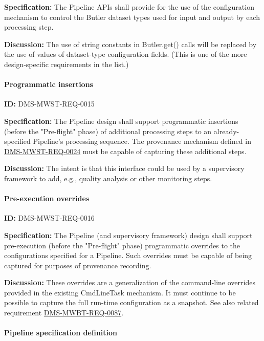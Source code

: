 \documentclass[SE,toc,lsstdraft]{lsstdoc}
\begin{document}
\textbf{Specification:}
The Pipeline APIs shall provide for the use of the configuration mechanism to control the Butler dataset types used for input and output by each processing step.

\textbf{Discussion:}
The use of string constants in Butler.get() calls will be replaced by the use of values of dataset-type configuration fields. (This is one of the more design-specific requirements in the list.)

\paragraph{Programmatic insertions}\hfill  %

\label{DMS-MWST-REQ-0015}
\textbf{ID:} DMS-MWST-REQ-0015

\textbf{Specification:}
The Pipeline design shall support programmatic insertions (before the "Pre-flight" phase) of additional processing steps to an already-specified Pipeline’s processing sequence. The provenance mechanism defined in \hyperref[DMS-MWST-REQ-0024]{DMS-MWST-REQ-0024} must be capable of capturing these additional steps.

\textbf{Discussion:}
The intent is that this interface could be used by a supervisory framework to add, e.g., quality analysis or other monitoring steps.

\paragraph{Pre-execution overrides}\hfill  %

\label{DMS-MWST-REQ-0016}
\textbf{ID:} DMS-MWST-REQ-0016

\textbf{Specification:}
The Pipeline (and supervisory framework) design shall support pre-execution (before the "Pre-flight" phase) programmatic overrides to the configurations specified for a Pipeline. Such overrides must be capable of being captured for purposes of provenance recording.

\textbf{Discussion:}
These overrides are a generalization of the command-line overrides provided in the existing CmdLineTask mechanism. It must continue to be possible to capture the full run-time configuration as a snapshot. See also related requirement \hyperref[DMS-MWBT-REQ-0087]{DMS-MWBT-REQ-0087}.

\paragraph{Pipeline specification definition}\hfill  %
\end{document}
